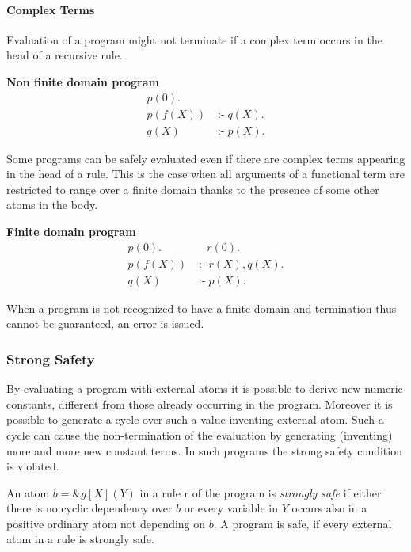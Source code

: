 \documentclass[a4paper, titlepage]{article}
\newcommand{\ext}[3]{\ensuremath{\&{\mathit{#1}}[#2](#3)}}
\DeclareMathOperator{\leftimpl}{:-}
\begin{document}
\paragraph{Complex Terms}
Evaluation of a program might not terminate if a complex term occurs in the head of a recursive rule.
\begin{exmp} \textbf{Non finite domain program}
\begin{align*}
p(0).&\\
p(f(X)) & \leftimpl q(X).\\
q(X) & \leftimpl p(X).
\end{align*}
\end{exmp}
Some programs can be safely evaluated even if there are complex terms appearing in the head of a rule. This is the case when all arguments of a functional term are restricted to range over a finite domain thanks to the presence of some other atoms in the body.
\begin{exmp} \textbf{Finite domain program}
\begin{align*}
p(0). & \quad r(0). \\
p(f(X)) & \leftimpl r(X), q(X). \\
q(X) & \leftimpl p(X).
\end{align*}
\end{exmp}
When a program is not recognized to have a finite domain and termination thus cannot be guaranteed, an error is issued. 

\subsubsection{Strong Safety}
By evaluating a program with external atoms
it is possible to derive new numeric constants,
different from those already occurring in the program.
Moreover it is possible to generate a cycle 
over such a value-inventing external atom.
Such a cycle can cause the non-termination
of the evaluation by generating (inventing)
more and more new constant terms.
In such programs the strong safety condition is violated.

An atom $b=\ext{g}{X}{Y}$ in a rule r of the program is \emph{strongly safe} if either there is no cyclic dependency over $b$   or every variable in $Y$ occurs also in a positive ordinary atom not depending on $b$. A program is safe, if every external atom in a rule is strongly safe. 
\end{document}
